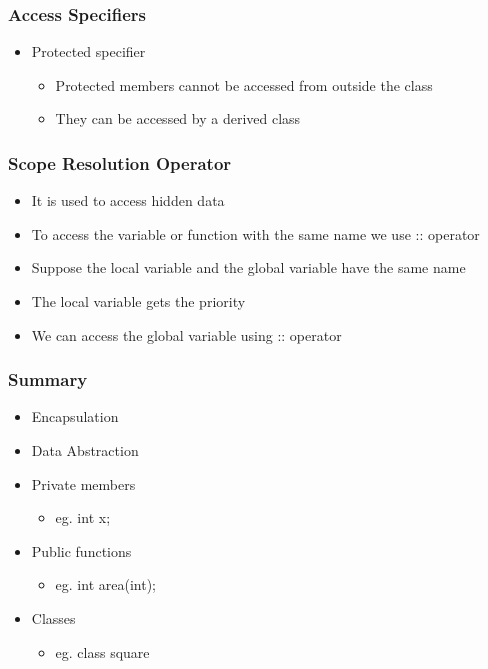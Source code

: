 \documentclass[17pt]{beamer}
\begin{document}
\begin{frame}
\frametitle{Access Specifiers}
\begin{itemize}[<+-|alert@+>]
\item Protected specifier \vspace{.30cm}
\begin{itemize}
\item Protected members cannot be accessed from outside the class \vspace{.30cm}
\item They can be accessed by a derived class
\end{itemize}
\end{itemize}
\end{frame}


\begin{frame}
\frametitle{Scope Resolution Operator} \pause
\begin{itemize}[<+-|alert@+>]
\item It is used to access hidden data
\item To access the variable or function with the same name we use :: operator
\item Suppose the local variable and the global variable have the same name
\item The local variable gets the priority
\item We can access the global variable using :: operator
\end{itemize}
\end{frame}


				
\begin{frame}	
\frametitle{Summary}
\begin{itemize}
\item Encapsulation \vspace{.15cm}
\item Data Abstraction \vspace{.15cm}
\item Private members \vspace{.15cm}
\begin{itemize}
\item eg. int x; \vspace{.15cm}
\end{itemize}
\item Public functions \vspace{.15cm}
\begin{itemize}
\item eg. int area(int); \vspace{.15cm}
\end{itemize}
\item Classes \vspace{.15cm}
\begin{itemize}
\item eg. class  square \vspace{.15cm}
\end{itemize}
\end{itemize}
\end{frame}		
	
\end{document}
